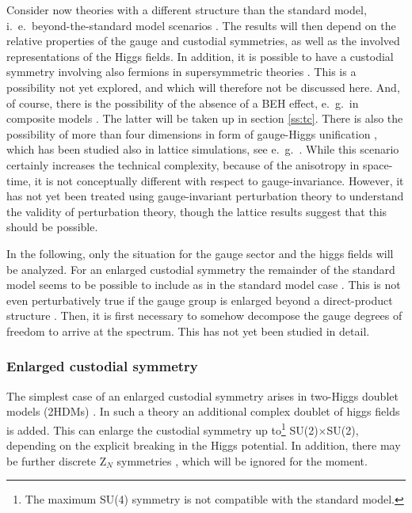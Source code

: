 \documentclass[final,twoside,12pt]{article}
\newcommand*{\1}{1\!\!\!\bot}
\begin{document}
Consider now theories with a different structure than the standard model, i.\ e.\ beyond-the-standard model scenarios \cite{Maas:2015gma}. The results will then depend on the relative properties of the gauge and custodial symmetries, as well as the involved representations of the Higgs fields. In addition, it is possible to have a custodial symmetry involving also fermions in supersymmetric theories \cite{Morrissey:2009tf,Aitchison:2007fn}. This is a possibility not yet explored, and which will therefore not be discussed here. And, of course, there is the possibility of the absence of a BEH effect, e.\ g.\ in composite models \cite{Hill:2002ap,Andersen:2011yj,Sannino:2009za,Sannino:2008ha,Morrissey:2009tf,DeGrand:2015zxa}. The latter will be taken up in section \ref{ss:tc}. There is also the possibility of more than four dimensions in form of gauge-Higgs unification \cite{Morrissey:2009tf}, which has been studied also in lattice simulations, see e.\ g.\ \cite{Lang:1986kq,Knechtli:2016pph,Alberti:2015pha,Irges:2013rya,Irges:2012mp}. While this scenario certainly increases the technical complexity, because of the anisotropy in space-time, it is not conceptually different with respect to gauge-invariance. However, it has not yet been treated using gauge-invariant perturbation theory to understand the validity of perturbation theory, though the lattice results suggest \cite{Alberti:2015pha,Knechtli:2016pph} that this should be possible.

In the following, only the situation for the gauge sector and the higgs fields will be analyzed. For an enlarged custodial symmetry the remainder of the standard model seems to be possible to include as in the standard model case \cite{Maas:2016qpu}. This is not even perturbatively true if the gauge group is enlarged beyond a direct-product structure \cite{Bohm:2001yx,Langacker:1980js}. Then, it is first necessary to somehow decompose the gauge degrees of freedom to arrive at the spectrum. This has not yet been studied in detail.

\subsubsection{Enlarged custodial symmetry}\label{sss:nhdm}

The simplest case of an enlarged custodial symmetry arises in two-Higgs doublet models (2HDMs) \cite{Morrissey:2009tf,Branco:2011iw,Ivanov:2017dad}. In such a theory an additional complex doublet of higgs fields is added. This can enlarge the custodial symmetry up to\footnote{The maximum SU(4) symmetry is not compatible with the standard model.} SU(2)$\times$SU(2), depending on the explicit breaking in the Higgs potential. In addition, there may be further discrete Z$_N$ symmetries \cite{Branco:2011iw}, which will be ignored for the moment.
\end{document}
